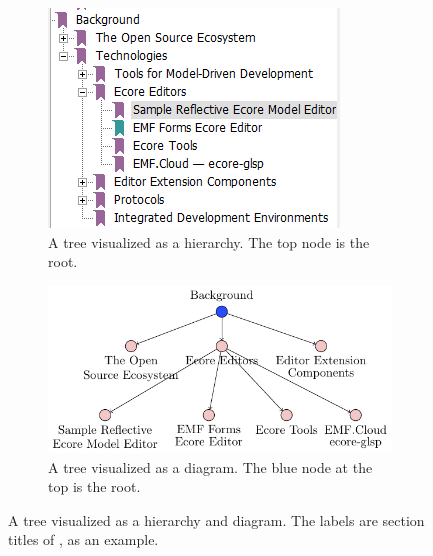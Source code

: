 \begin{figure}[htbp]
    \centering
    \begin{subfigure}[b]{.45\textwidth}
        \centering
        \includegraphics[width=\textwidth]{figures/tree-hierarchy.png}
        \caption{A tree visualized as a hierarchy. The top node is the root.}\label{sfig:tree-visualized-hierarchy}
    \end{subfigure}
    \hfill
    \begin{subfigure}[b]{.45\textwidth}
        \centering
        \includegraphics[width=\textwidth]{figures/tree-diagram.pdf}
        \caption{A tree visualized as a diagram. The blue node at the top is the root.}\label{sfig:tree-visualized-diagram}
    \end{subfigure}
    \caption[Tree Structure Visualizations]{A tree visualized as a hierarchy and diagram. The labels are section titles of \cite{rekstadModelingEnvironmentCloud2020}, as an example.}\label{fig:tree-visualized}
\end{figure}

